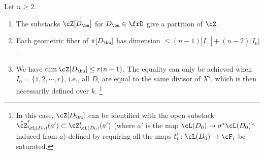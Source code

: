 \begin{prop}
\notready\label{p:ShM dim} Let $n \geq 2$.
\begin{enumerate}
\item The substacks $\cZ[D_{\bu}]$ for $D_{\bu}\in \frD$ give a partition of $\cZ$.
\item Each geometric fiber of $\pi[D_{\bu}]$ has dimension $\le (n-1)|I_{+}|+(n-2)|I_{0}|$.
\item We have $\dim \cZ[D_{\bu}]\le r(n-1)$. The equality can only be achieved when  $I_{0}=\{1,2,\cdots, r\}$, i.e., all $D_{i}$ are equal to the same divisor of $X'$, which is then necessarily defined over $k$. \footnote{In this case, $\cZ[D_{\bu}]$ can be identified with the open substack $\mathring{\cZ}^{r}_{\cL(D_{0})}(a')\subset \cZ^{r}_{\cL(D_{0})}(a')$ (where $a'$ is the map $\cL(D_{0}) \rightarrow \sigma^* \cL(D_{0})^{\vee}$ induced from $a$) defined by requiring all the maps $t'_{i}: \cL(D_{0})\to \cF_{i}$ be saturated.}
\end{enumerate}
\end{prop}
